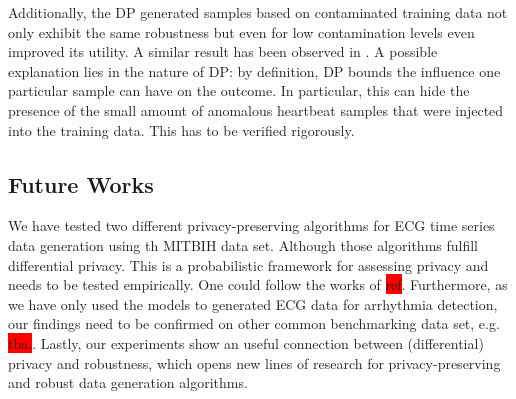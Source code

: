 Additionally, the DP generated samples based on contaminated training data not only exhibit the same robustness but even for low contamination levels even improved its utility. A similar result has been observed in \parencite{du2019robust}. A possible explanation lies in the nature of DP: by definition, DP bounds the influence one particular sample can have on the outcome. In particular, this can hide the presence of the small amount of anomalous heartbeat samples that were injected into the training data. This has to be verified rigorously.


\subsection{Future Works}

We have tested two different privacy-preserving algorithms for ECG time series data generation using th MITBIH data set. Although those algorithms fulfill differential privacy. This is a probabilistic framework for assessing privacy and needs to be tested empirically. One could follow the works of \colorbox{red}{ref}. 
Furthermore, as we have only used the models to generated ECG data for arrhythmia detection, our findings need to be confirmed on other common benchmarking data set, e.g. \colorbox{red}{tba.}.
Lastly, our experiments show an useful connection between (differential) privacy and robustness, which opens new lines of research for privacy-preserving and robust data generation algorithms.

